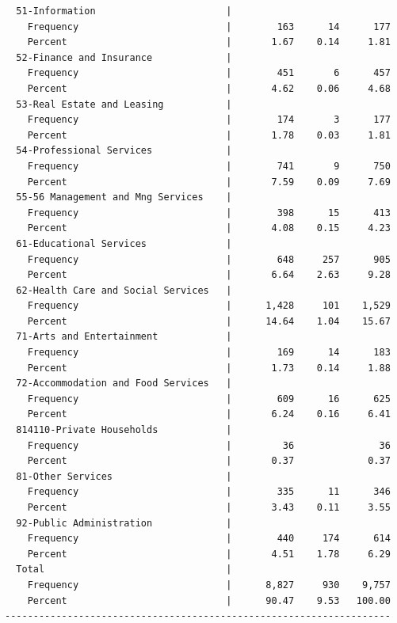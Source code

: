 \documentclass[
]{book}
\begin{document}
\begin{verbatim}
  51-Information                       |                            
    Frequency                          |        163      14      177
    Percent                            |       1.67    0.14     1.81
  52-Finance and Insurance             |                            
    Frequency                          |        451       6      457
    Percent                            |       4.62    0.06     4.68
  53-Real Estate and Leasing           |                            
    Frequency                          |        174       3      177
    Percent                            |       1.78    0.03     1.81
  54-Professional Services             |                            
    Frequency                          |        741       9      750
    Percent                            |       7.59    0.09     7.69
  55-56 Management and Mng Services    |                            
    Frequency                          |        398      15      413
    Percent                            |       4.08    0.15     4.23
  61-Educational Services              |                            
    Frequency                          |        648     257      905
    Percent                            |       6.64    2.63     9.28
  62-Health Care and Social Services   |                            
    Frequency                          |      1,428     101    1,529
    Percent                            |      14.64    1.04    15.67
  71-Arts and Entertainment            |                            
    Frequency                          |        169      14      183
    Percent                            |       1.73    0.14     1.88
  72-Accommodation and Food Services   |                            
    Frequency                          |        609      16      625
    Percent                            |       6.24    0.16     6.41
  814110-Private Households            |                            
    Frequency                          |         36               36
    Percent                            |       0.37             0.37
  81-Other Services                    |                            
    Frequency                          |        335      11      346
    Percent                            |       3.43    0.11     3.55
  92-Public Administration             |                            
    Frequency                          |        440     174      614
    Percent                            |       4.51    1.78     6.29
  Total                                |                            
    Frequency                          |      8,827     930    9,757
    Percent                            |      90.47    9.53   100.00
--------------------------------------------------------------------
\end{verbatim}
\end{document}
